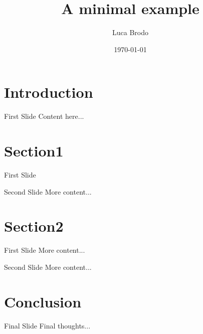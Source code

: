 \documentclass{beamer}
\title{A minimal example}
\date{\today}
\author{Luca Brodo}
\institute{Hochschule Hamm-Lippstadt}
\begin{document}
	
	\maketitle
	
\addtocounter{framenumber}{1}
\section{Introduction}

\begin{frame}{First Slide}
	Content here...
\end{frame}


\section{Section1}

\begin{frame}{First Slide}
	\begin{itemize}[ itemsep=1em]
		
	\end{itemize}
\end{frame}
\begin{frame}{Second Slide}
	More content...
\end{frame}
\section{Section2}
\begin{frame}{First Slide}
	More content...
\end{frame}
\begin{frame}{Second Slide}
	More content...
\end{frame}
\section{Conclusion}
\begin{frame}{Final Slide}
	Final thoughts...
\end{frame}
\end{document}
